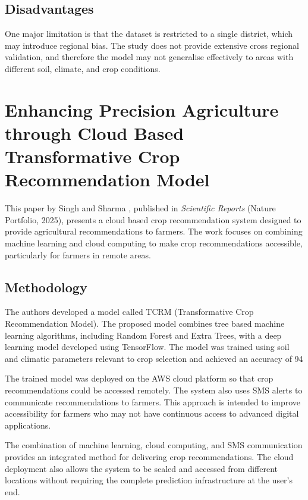 \subsection{Disadvantages}

One major limitation is that the dataset is restricted to a single district, which may introduce regional bias. The study does not provide extensive cross regional validation, and therefore the model may not generalise effectively to areas with different soil, climate, and crop conditions.

\section{Enhancing Precision Agriculture through Cloud Based Transformative Crop Recommendation Model}

This paper by Singh and Sharma , published in \emph{Scientific Reports} (Nature Portfolio, 2025), presents a cloud based crop recommendation system designed to provide agricultural recommendations to farmers. The work focuses on combining machine learning and cloud computing to make crop recommendations accessible, particularly for farmers in remote areas.

\subsection{Methodology}

The authors developed a model called TCRM (Transformative Crop Recommendation Model). The proposed model combines tree based machine learning algorithms, including Random Forest and Extra Trees, with a deep learning model developed using TensorFlow. The model was trained using soil and climatic parameters relevant to crop selection and achieved an accuracy of 94%

The trained model was deployed on the AWS cloud platform so that crop recommendations could be accessed remotely. The system also uses SMS alerts to communicate recommendations to farmers. This approach is intended to improve accessibility for farmers who may not have continuous access to advanced digital applications.

The combination of machine learning, cloud computing, and SMS communication provides an integrated method for delivering crop recommendations. The cloud deployment also allows the system to be scaled and accessed from different locations without requiring the complete prediction infrastructure at the user's end.

